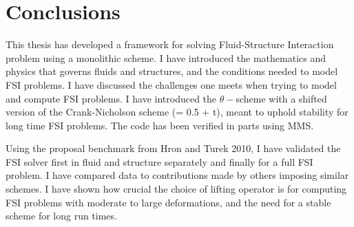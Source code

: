 \section{Conclusions}
This thesis has developed a framework for solving Fluid-Structure Interaction problem using a monolithic scheme. I have introduced the mathematics and physics that governs fluids and structures, and the conditions needed to model FSI problems. I have discussed the challenges one meets when trying to model and compute FSI problems. I have introduced the $\theta-$scheme with a shifted version of the Crank-Nicholson scheme (\theta = 0.5 + \Delta t), meant to uphold stability for long time FSI problems. The code has been verified in parts using MMS. \newline

Using the proposal benchmark from Hron and Turek 2010, I have validated the FSI solver first in fluid and structure separately and finally for a full FSI problem. I have compared data to contributions made by others imposing similar schemes. I have shown how crucial the choice of lifting operator is for computing FSI problems with moderate to large deformations, and the need for a stable scheme for long run times.

